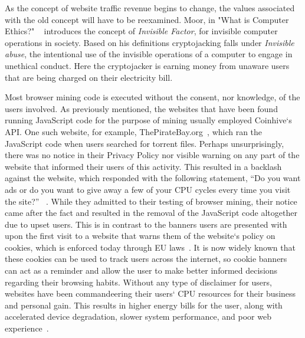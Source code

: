 As the concept of website traffic revenue begins to change, the values associated with the old concept will have to be reexamined. Moor, in "What is Computer Ethics?" ~\cite{moor1985computer} introduces the concept of \textit{Invisible Factor}, for invisible computer operations in society. Based on his definitions cryptojacking falls under \textit{Invisible abuse}, the intentional use of the invisible operations of a computer to engage in unethical conduct. Here the cryptojacker is earning money from unaware users that are being charged on their electricity bill. 

Most browser mining code is executed without the consent, nor knowledge, of the users involved. As previously mentioned, the websites that have been found running JavaScript code for the purpose of mining usually employed Coinhive`s API. One such website, for example, ThePirateBay.org~\cite{bbcmintcrypto}, which ran the JavaScript code when users searched for torrent files. Perhaps unsurprisingly, there was no notice in their Privacy Policy nor visible warning on any part of the website that informed their users of this activity. This resulted in a backlash against the website, which responded with the following statement, ``Do you want ads or do you want to give away a few of your CPU cycles every time you visit the site?'' ~\cite{piratesbayblog}. While they admitted to their testing of browser mining, their notice came after the fact and resulted in the removal of the JavaScript code altogether due to upset users. This is in contrast to the banners users are presented with upon the first visit to a website that warns them of the website`s policy on cookies, which is enforced today through EU laws~\cite{eucookie}. It is now widely known that these cookies can be used to track users across the internet, so cookie banners can act as a reminder and allow the user to make better informed decisions regarding their browsing habits. Without any type of disclaimer for users, websites have been commandeering their users` CPU resources for their business and personal gain. This results in higher energy bills for the user, along with accelerated device degradation, slower system performance, and poor web experience~\cite{httparchiveminingimpact}\cite{gaurdianelectricity}.



